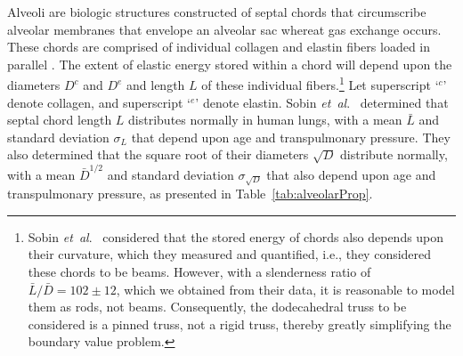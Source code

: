 Alveoli are biologic structures constructed of septal chords that circumscribe alveolar membranes that envelope an alveolar sac whereat gas exchange occurs.  These chords are comprised of individual collagen and elastin fibers loaded in parallel \cite{Matsudaetal87,Sobinetal88}.  The extent of elastic energy stored within a chord will depend upon the diameters $D^c$ and $D^e$ and length $L$ of these individual fibers.\footnote{
	Sobin \textit{et~al}.\ \cite{Sobinetal88} considered that the stored energy of chords also depends upon their curvature, which they measured and quantified, i.e., they considered these chords to be beams.  However, with a slenderness ratio of $\bar{L}/\bar{D} = 102 \pm 12$, which we obtained from their data, it is reasonable to model them as rods, not beams.  Consequently, the dodecahedral truss to be considered is a pinned truss, not a rigid truss, thereby greatly simplifying the boundary value problem.
}
Let superscript `$\mbox{}^c$' denote collagen, and superscript `$\mbox{}^e$' denote elastin.  Sobin \textit{et~al}.\ \cite{Sobinetal88} determined that septal chord length $L$ distributes normally in human lungs, with a mean $\bar{L}$ and standard deviation $\sigma_L$ that depend upon age and transpulmonary pressure.  They also determined that the square root of their diameters $\sqrt{D}$ distribute normally, with a mean $\bar{D}^{1/2}$ and standard deviation $\sigma_{\sqrt{D}}$ that also depend upon age and transpulmonary pressure, as presented in Table~\ref{tab:alveolarProp}. 

